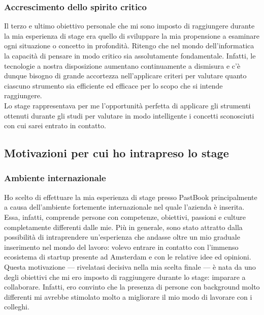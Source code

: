			\subsubsection{Accrescimento dello spirito critico}
				Il terzo e ultimo obiettivo personale che mi sono imposto di raggiungere durante la mia esperienza di stage era
				quello di sviluppare la mia propensione a esaminare ogni situazione o concetto in profondità. Ritengo che nel mondo
				dell'informatica la capacità di pensare in modo critico sia assolutamente fondamentale. Infatti, le tecnologie a
				nostra disposizione aumentano continuamente a dismisura e c'è dunque bisogno di grande accortezza nell'applicare
				criteri per valutare quanto ciascuno strumento sia efficiente ed efficace per lo scopo che si intende raggiungere.\\
				Lo stage rappresentava per me l'opportunità perfetta di applicare gli strumenti ottenuti durante gli studi per
				valutare in modo intelligente i concetti sconosciuti con cui sarei entrato in contatto.
		\subsection{Motivazioni per cui ho intrapreso lo stage}
			\subsubsection{Ambiente internazionale}
				Ho scelto di effettuare la mia esperienza di stage presso PastBook principalmente a causa dell'ambiente fortemente
				internazionale nel quale l'azienda è inserita. Essa, infatti, comprende persone con competenze, obiettivi, passioni
				e culture completamente differenti dalle mie. Più in generale, sono stato attratto dalla possibilità di intraprendere
				un'esperienza che andasse oltre un mio graduale inserimento nel mondo del lavoro: volevo entrare in contatto con
				l'immenso ecosistema di startup presente ad Amsterdam e con le relative idee ed opinioni.\\
				Questa motivazione — rivelatasi decisiva nella mia scelta finale — è nata da uno degli obiettivi che mi ero imposto
				di raggiungere durante lo stage: imparare a collaborare. Infatti, ero convinto che la presenza di persone con
				background molto differenti mi avrebbe stimolato molto a migliorare il mio modo di lavorare con i colleghi.
